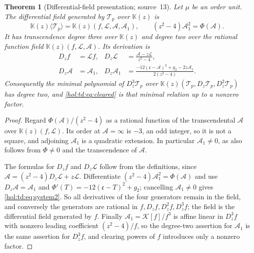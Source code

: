 \documentclass[11pt]{article}
\numberwithin{equation}{section}
\newtheorem{theorem}{Theorem}[section]
\theoremstyle{definition}
\theoremstyle{remark}
\newcommand{\KK}{\mathbb K}
\begin{document}
\begin{theorem}[Differential-field presentation; source~13]
\label{hol:td:thm:field}
Let $\mu$ be an order unit. The differential field generated by $\mathcal T_p$
over $\KK(z)$ is
\begin{equation}\label{hol:td:eq:field}
 \KK(z)\langle\mathcal T_p\rangle=\KK(z)(f,\mathcal L,\mathcal A,\mathcal A_1),
 \qquad (z^2-4)\mathcal A_1^2=\Phi(\mathcal A).
\end{equation}
It has transcendence degree three over $\KK(z)$ and degree two over the
rational function field $\KK(z)(f,\mathcal L,\mathcal A)$. Its derivation is
\begin{align}
 D_zf&=\mathcal Lf,& D_z\mathcal L&=\frac{\mathcal A-z\mathcal L}{z^2-4},
 \label{hol:td:eq:system1}\\
 D_z\mathcal A&=\mathcal A_1,&
 D_z\mathcal A_1&=\frac{-12(\mathfrak c-\mathcal A)^2+g_2-2z\mathcal A_1}{2(z^2-4)}.
 \label{hol:td:eq:system2}
\end{align}
Consequently the minimal polynomial of $D_z^3\mathcal T_p$ over
$\KK(z)(\mathcal T_p,D_z\mathcal T_p,D_z^2\mathcal T_p)$ has degree two, and
\eqref{hol:td:eq:cleared} is that minimal relation up to a nonzero factor.
\end{theorem}

\begin{proof}
Regard $\Phi(\mathcal A)/(z^2-4)$ as a rational function of the transcendental
$\mathcal A$ over $\KK(z)(f,\mathcal L)$. Its order at $\mathcal A=\infty$ is
$-3$, an odd integer, so it is not a square, and adjoining $\mathcal A_1$ is a
quadratic extension. In particular $\mathcal A_1\ne0$, as also follows from
$\Phi\ne0$ and the transcendence of $\mathcal A$.

The formulas for $D_zf$ and $D_z\mathcal L$ follow from the definitions, since
$\mathcal A=(z^2-4)D_z\mathcal L+z\mathcal L$. Differentiate
$(z^2-4)\mathcal A_1^2=\Phi(\mathcal A)$ and use $D_z\mathcal A=\mathcal A_1$
and $\Phi'(T)=-12(\mathfrak c-T)^2+g_2$; cancelling $\mathcal A_1\ne0$ gives
\eqref{hol:td:eq:system2}. So all derivatives of the four generators remain in
the field, and conversely the generators are rational in
$f,D_zf,D_z^2f,D_z^3f$; the field is the differential field generated by $f$.
Finally $\mathcal A_1=\mathcal K[f]/f^3$ is affine linear in $D_z^3f$ with
nonzero leading coefficient $(z^2-4)/f$, so the degree-two assertion for
$\mathcal A_1$ is the same assertion for $D_z^3f$, and clearing powers of $f$
introduces only a nonzero factor.
\end{proof}
\end{document}
